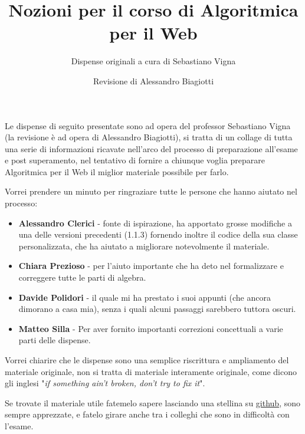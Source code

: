 \documentclass[a4paper]{book-enhanced}
\title{Nozioni per il corso di Algoritmica per il Web}
\subtitle{Dispense originali a cura di Sebastiano Vigna}
\author{Revisione di Alessandro Biagiotti}
\begin{document}
\maketitle
\noindent Le dispense di seguito presentate sono ad opera del professor Sebastiano Vigna (la
revisione è ad opera di Alessandro Biagiotti), si tratta di un collage di tutta una serie di
informazioni ricavate nell'arco del processo di preparazione all'esame e post superamento, nel tentativo di fornire a chiunque voglia preparare Algoritmica per il Web il miglior materiale possibile per farlo.

Vorrei prendere un minuto per ringraziare tutte le persone che hanno aiutato nel processo:
\begin{itemize}
    \item\textbf{Alessandro Clerici} - fonte di ispirazione, ha apportato grosse modifiche a una delle versioni precedenti (1.1.3) fornendo inoltre il codice della sua classe personalizzata, che ha aiutato a migliorare notevolmente il materiale. 

    \item\textbf{Chiara Prezioso} - per l'aiuto importante che ha deto nel formalizzare e correggere tutte le parti di algebra. 

    \item\textbf{Davide Polidori} - il quale mi ha prestato i suoi appunti (che ancora dimorano a casa mia), senza i quali alcuni passaggi sarebbero tuttora oscuri.

    \item\textbf{Matteo Silla} - Per aver fornito importanti correzioni concettuali a varie parti delle dispense.
\end{itemize}

Vorrei chiarire che le dispense sono una semplice riscrittura e ampliamento del materiale originale, non si tratta di materiale interamente originale, come dicono gli inglesi "\textit{if something ain't broken, don't try to fix it}".

Se trovate il materiale utile fatemelo sapere lasciando una stellina su \href{https://github.com/S3gmentati0nFault/Algoweb}{github}, sono sempre apprezzate, e fatelo girare anche tra i colleghi che sono in difficoltà con l'esame.

\tableofcontents
\clearpage



\end{document}
